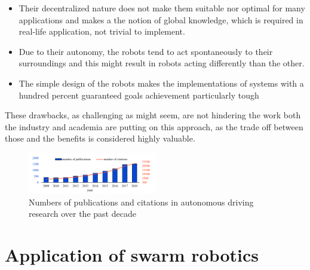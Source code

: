 \documentclass[conference]{IEEEtran}
\begin{document}
\begin{itemize}
    \item Their decentralized nature does not make them suitable nor optimal for many applications and makes a the notion of global knowledge, which is required in real-life application, not trivial to implement. 
    \item Due to their autonomy, the robots tend to act spontaneously to their surroundings and this might result in robots acting differently than the other. 
    \item The simple design of the robots makes the implementations of systems with a hundred percent guaranteed goals achievement particularly tough
\end{itemize}
These drawbacks, as challenging as might seem, are not hindering the work both the industry and academia are putting on this approach, as the trade off between those and the benefits is considered highly valuable. 
\begin{figure}
    \centering
    \includegraphics[width=0.5\textwidth]{img/cars_papers.png}
    \caption{Numbers of publications and citations in autonomous driving research over the past decade \cite{unknown}}
    \label{fig:cars_papers}
\end{figure}

\section{Application of swarm robotics}
\end{document}
